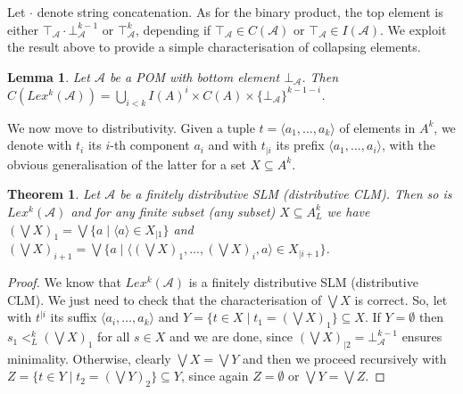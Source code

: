 \documentclass[a4paper]{elsarticle}
\newtheorem{lemma}{Lemma}
\newtheorem{theorem}{Theorem}
\newcommand{\1}{\mathbf{1}}
\begin{document}
Let $\cdot$ denote string concatenation.
As for the binary product, the top element is 
either $\top_\mathcal{A} \cdot \bot_\mathcal{A}^{k-1}$ or $\top_\mathcal{A}^k$,
depending if $\top_\mathcal{A} \in C(\mathcal{A})$ or $\top_\mathcal{A} \in I(\mathcal{A})$.
%
We exploit the result above to provide a simple characterisation of collapsing elements.

\begin{lemma}
	Let $\mathcal{A}$ be a POM with bottom element $\bot_\mathcal{A}$.
	Then $C(Lex^{k}(\mathcal{A})) = \bigcup_{i < k}I(A)^i \times C(A) \times \{\bot_\mathcal{A}\}^{k-1-i}$.
\end{lemma}


We now move to distributivity. 
Given a tuple $t = \langle a_1, \ldots, a_k \rangle$ of elements in $A^k$, we denote with $t_i$ its 
$i$-th component $a_i$ and with $t_{\mid i}$ its prefix $\langle a_1, \ldots, a_i \rangle$,
with the obvious generalisation of the latter for a set $X \subseteq A^k$.

\begin{theorem}\label{theo:lexiSLM}
	Let $\mathcal{A}$ be a finitely distributive SLM (distributive CLM).
	Then so is $Lex^k(\mathcal{A})$ %
	and for any finite subset (any subset) $X \subseteq A^k_L$ 
         we have $(\bigvee X)_1 = \bigvee \{ a \mid \langle a \rangle \in X_{\mid 1}\}$
         and $(\bigvee X)_{i+1} = \bigvee \{ a \mid \langle (\bigvee X)_1, \ldots, (\bigvee X)_i, a \rangle \in X_{\mid i+1}\}$.
\end{theorem}
\begin{proof}
	We know that $Lex^k(\mathcal{A})$ is a finitely distributive SLM (distributive CLM). We just need to check that
	 the characterisation of $\bigvee X$ is correct. So, let with $t^{\mid i}$ its suffix $\langle a_i, \ldots, a_k \rangle$
	 and $Y = \{ t \in X \mid t_1 = (\bigvee X)_1\} \subseteq X$. 
	If $Y= \emptyset$ then $s_1 <^k_L (\bigvee X)_1$ for all $s \in X$ and we are done,
	since $(\bigvee X)_{\mid 2} = \bot^{k-1}_\mathcal{A}$ ensures minimality.
	Otherwise, clearly $\bigvee X = \bigvee Y$ and then we proceed 
	recursively with  $Z =  \{ t \in Y \mid t_2 = (\bigvee Y)_2\} \subseteq Y$,
	since again $Z = \emptyset$ or $\bigvee Y = \bigvee Z$.
\end{proof}
\end{document}
